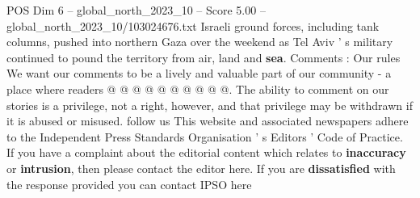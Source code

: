 \begin{textsample}{POS Dim 6 – global\_north\_2023\_10 – Score 5.00 – global\_north\_2023\_10/103024676.txt}
Israeli ground forces, including tank columns, pushed into northern Gaza over the weekend as Tel Aviv ' s military continued to pound the territory from air, land and \textbf{sea}.
Comments : Our rules We want our comments to be a lively and valuable part of our community - a place where readers @ @ @ @ @ @ @ @ @ @.
The ability to comment on our stories is a privilege, not a right, however, and that privilege may be withdrawn if it is abused or misused. follow us This website and associated newspapers adhere to the Independent Press Standards Organisation ' s Editors ' Code of Practice.
If you have a complaint about the editorial content which relates to \textbf{inaccuracy} or \textbf{intrusion}, then please contact the editor here.
If you are \textbf{dissatisfied} with the response provided you can contact IPSO here

\end{textsample}
